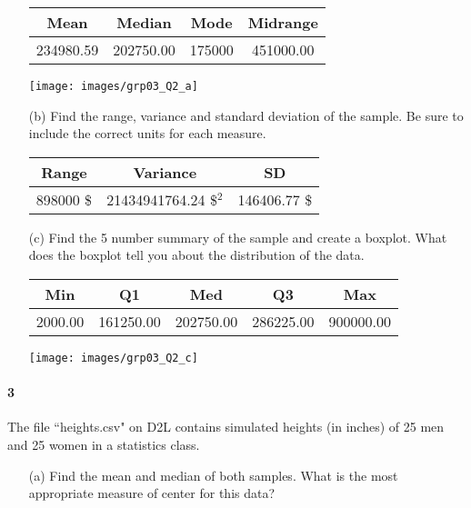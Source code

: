 \documentclass{article}
\begin{document}
\begin{flushleft}
\begin{itemize}
\bigskip
{\centering
\begin{tabular}{cccc}
Mean & Median & Mode & Midrange \\ 
  \hline
234980.59 & 202750.00 & 175000 & 451000.00 \\ 
\end{tabular}
\par}
\bigskip
{}

\bigskip
{\centering
\texttt{[image: images/grp03\_Q2\_a]}
\par}

\vspace{.5in}
\item[(b)] Find the range, variance and standard deviation of the sample. Be sure to include the correct units for each measure.\\

\bigskip
{\centering
\begin{tabular}{ccc}
Range & Variance & SD \\ 
  \hline
898000 \$ & 21434941764.24 \$$^2$ & 146406.77 \$ \\ 
\end{tabular}
\par}
\vspace{.5in}

\newpage
\item[(c)] Find the 5 number summary of the sample and create a boxplot. What does the boxplot tell you about the distribution of the data.\\

\bigskip
{\centering
\begin{tabular}{ccccc}
Min & Q1 & Med & Q3 & Max \\ 
  \hline
2000.00 & 161250.00 & 202750.00 & 286225.00 & 900000.00 \\ 
\end{tabular}
\par}

\bigskip
{\centering
\texttt{[image: images/grp03\_Q2\_c]}
\par}

\bigskip
{}
\end{itemize}

\newpage
\paragraph{3} The file ``heights.csv" on D2L contains simulated heights (in inches) of 25 men and 25 women in a statistics class. 
\begin{itemize}
\item [(a)] Find the mean and median of both samples. What is the most appropriate measure of center for this data?\\


\end{itemize}
\end{flushleft}
\end{document}
